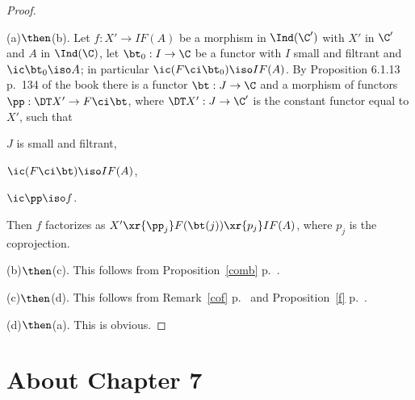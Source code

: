 \documentclass[12pt]{article}
\theoremstyle{remark}
\theoremstyle{definition}
\begin{document}
\begin{proof}\ 

\nn(a)$\then$(b). Let $f:X'\to IF(A)$ be a morphism in $\Ind(\C')$ with $X'$ in $\C'$ and $A$ in $\Ind(\C)$, let $\bt_0:I\to\C$ be a functor with $I$ small and filtrant and $\ic\bt_0\iso A$; in particular $\ic(F\ci\bt_0)\iso IF(A)$. By Proposition 6.1.13 p.~134 of the book there is a functor $\bt:J\to\C$ and a morphism of functors $\pp:\DT X'\to F\ci\bt$, where $\DT X':J\to\C'$ is the constant functor equal to $X'$, such that 

$J$ is small and filtrant, 

$\ic(F\ci\bt)\iso IF(A)$, 

$\ic\pp\iso f$. 

\nn Then $f$ factorizes as $X'\xr{\pp_j}F(\bt(j))\xr{p_j}IF(A)$, where $p_j$ is the coprojection.

\nn(b)$\then$(c). This follows from Proposition~\ref{comb} p.~. 

\nn(c)$\then$(d). This follows from Remark~\ref{cof} p.~ and Proposition~\ref{f} p.~. 

\nn(d)$\then$(a). This is obvious.
\end{proof}


\section{About Chapter 7}


\begin{comment}

\begin{s} 
P.~149, Definition 7.1.1. The set $\SSS$ is a subset of $\Ob(\Mor(\C))$ (see Notation~\ref{mor} p.~\pr{mor}). The proof of the following lemma (which will be used to prove \qr{qdd} p.~\pr{qdd}) is obvious. Neither Definition 7.1.1 nor the lemma below requires the Axiom of Universes.

\begin{lem}\lb{711}
Let 
$$
\begin{tikzcd}\C\ar[yshift=.5ex]{r}{Q}&\C'\ar[yshift=-.4ex]{l}{R}\end{tikzcd}
$$ 
be functors such that $Q\ci R\iso\id_{\C'}$, let $\SSS$ be a subset of $\Ob(\Mor(\C))$ such that $Q(s)$ is an isomorphism for all $s$ in $\SSS$, let 
$$
\theta:\id_\C\to R\ci Q
$$ 
satisfy $\theta_X\in\SSS$ for all $X$ in $\C$, let $\A$ be a category, and let $\B$ be the full subcategory of $\A^\C$ whose objects are the functors turning the elements of $\SSS$ into isomorphisms. Then the functors
$$
\begin{tikzcd}\A^{\C'}\ar[yshift=.4ex]{r}{\ci Q}&\B\ar[yshift=-.5ex]{l}{\ci R}\end{tikzcd}
$$
are mutually quasi-inverse equivalences. In particular, $Q$ is a localization of $\C$ by $\SSS$. 
\end{lem}
\end{s}

\end{comment}
\end{document}
